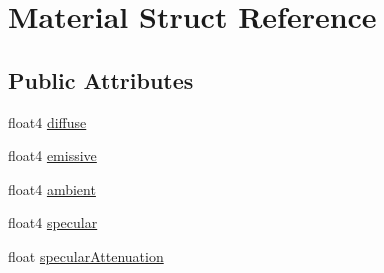 \hypertarget{struct_material}{
\section{Material Struct Reference}
\label{struct_material}
}
\subsection*{Public Attributes}
\begin{DoxyCompactItemize}
\item 
float4 \hyperlink{struct_material_a1c55452b2bb7f89198793ed123cf2b77}{diffuse}
\item 
float4 \hyperlink{struct_material_aeb6810b6c022a1e7b1d3aeed4822c5d5}{emissive}
\item 
float4 \hyperlink{struct_material_ae5a78a4bf0b887ac19dc2791462fed0c}{ambient}
\item 
float4 \hyperlink{struct_material_a854d31d1218ac21334f2c5bd7b04bae3}{specular}
\item 
float \hyperlink{struct_material_a4580ca0557402f1b992cb8156c535343}{specularAttenuation}
\end{DoxyCompactItemize}



